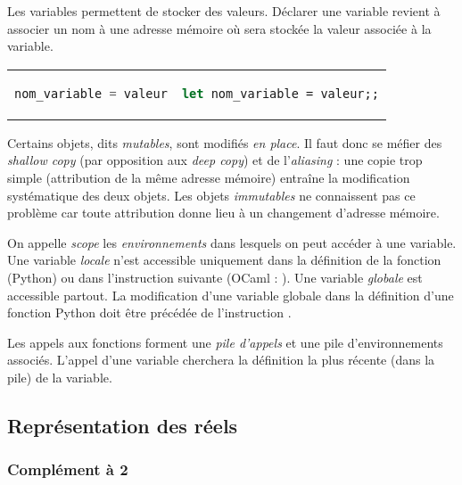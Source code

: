 \documentclass{hibiscus}
\begin{document}
\par Les variables permettent de stocker des valeurs. Déclarer une variable revient à associer un nom à une adresse mémoire où sera stockée la valeur associée à la variable.

\begin{tabular}{p{} p{}}
\begin{lstlisting}[language=Python]
nom_variable = valeur
\end{lstlisting}
&
\begin{lstlisting}[language=Caml]
let nom_variable = valeur;;
\end{lstlisting}
\end{tabular}

\medskip \par Certains objets, dits \textit{mutables}, sont modifiés \textit{en place}. Il faut donc se méfier des \textit{shallow copy} (par opposition aux \textit{deep copy}) et de l'\textit{aliasing} : une copie trop simple (attribution de la même adresse mémoire) entraîne la modification systématique des deux objets. Les objets \textit{immutables} ne connaissent pas ce problème car toute attribution donne lieu à un changement d'adresse mémoire.

\medskip \par On appelle \textit{scope} les \textit{environnements} dans lesquels on peut accéder à une variable. Une variable \textit{locale} n'est accessible uniquement dans la définition de la fonction (Python) ou dans l'instruction suivante (OCaml : ). Une variable \textit{globale} est accessible partout. La modification d'une variable globale dans la définition d'une fonction Python doit être précédée de l'instruction .

\medskip \par Les appels aux fonctions forment une \textit{pile d'appels} et une pile d'environnements associés. L'appel d'une variable cherchera la définition la plus récente (dans la pile) de la variable.

\subsection{Représentation des réels}

\subsubsection{Complément à 2}
\end{document}
